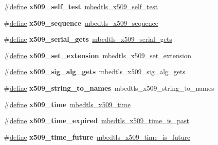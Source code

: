 \begin{DoxyCompactItemize}
\#\hyperlink{structdefine}{define} {\bfseries x509\+\_\+self\+\_\+test}~\hyperlink{x509_8h_a6a66d211cc827839cf46a7dfcb849dc0}{mbedtls\+\_\+x509\+\_\+self\+\_\+test}
\item 
\mbox{\label{compat-1_83_8h_ab694b0c2c7b30557a5b61bdbeec6eab8}} 
\#\hyperlink{structdefine}{define} {\bfseries x509\+\_\+sequence}~\hyperlink{group__x509__module_gabd52d60a09315854d9ef849d02154f35}{mbedtls\+\_\+x509\+\_\+sequence}
\item 
\mbox{\label{compat-1_83_8h_aef5b60c300ccd65c99cf179f72a7766c}} 
\#\hyperlink{structdefine}{define} {\bfseries x509\+\_\+serial\+\_\+gets}~\hyperlink{x509_8h_af9ce1b81550ac7290706f99c71150e4d}{mbedtls\+\_\+x509\+\_\+serial\+\_\+gets}
\item 
\mbox{\label{compat-1_83_8h_ae79f625906aeb7d7cbec6f31fb1318ea}} 
\#\hyperlink{structdefine}{define} {\bfseries x509\+\_\+set\+\_\+extension}~mbedtls\+\_\+x509\+\_\+set\+\_\+extension
\item 
\mbox{\label{compat-1_83_8h_ae678f08ce4b5a62e17c28e00d59a2c57}} 
\#\hyperlink{structdefine}{define} {\bfseries x509\+\_\+sig\+\_\+alg\+\_\+gets}~mbedtls\+\_\+x509\+\_\+sig\+\_\+alg\+\_\+gets
\item 
\mbox{\label{compat-1_83_8h_a235c3452a51701436f08286239f750b2}} 
\#\hyperlink{structdefine}{define} {\bfseries x509\+\_\+string\+\_\+to\+\_\+names}~mbedtls\+\_\+x509\+\_\+string\+\_\+to\+\_\+names
\item 
\mbox{\label{compat-1_83_8h_af848c676656aa4683a624c0e389c7c81}} 
\#\hyperlink{structdefine}{define} {\bfseries x509\+\_\+time}~\hyperlink{structmbedtls__x509__time}{mbedtls\+\_\+x509\+\_\+time}
\item 
\mbox{\label{compat-1_83_8h_a66e9d398304eed2b39020b960e119e4b}} 
\#\hyperlink{structdefine}{define} {\bfseries x509\+\_\+time\+\_\+expired}~\hyperlink{x509_8h_aff59bcfa98af02a3b9a5086a6b48fcb5}{mbedtls\+\_\+x509\+\_\+time\+\_\+is\+\_\+past}
\item 
\mbox{\label{compat-1_83_8h_a1e8e0ccff9ef41cb2f1506aff9260f1a}} 
\#\hyperlink{structdefine}{define} {\bfseries x509\+\_\+time\+\_\+future}~\hyperlink{x509_8h_a294400391e6c19a208d8a279b8e1fee1}{mbedtls\+\_\+x509\+\_\+time\+\_\+is\+\_\+future}

\end{DoxyCompactItemize}

